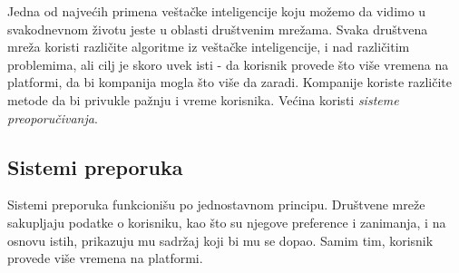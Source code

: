 \documentclass[a4paper]{article}
\newtheorem{primer}{Primer}[section]
\begin{document}
{Jedna od najvećih primena veštačke inteligencije koju možemo da vidimo u svakodnevnom životu jeste u oblasti društvenim mrežama. Svaka društvena mreža koristi različite algoritme iz veštačke inteligencije, i nad različitim problemima,
ali cilj je skoro uvek isti - da korisnik provede što više vremena na platformi, da bi kompanija mogla što više da zaradi.
Kompanije koriste različite metode da bi privukle pažnju i vreme korisnika. Većina koristi \emph{sisteme preoporučivanja}.
\subsection{Sistemi preporuka}
Sistemi preporuka funkcionišu po jednostavnom principu. Društvene mreže sakupljaju podatke o korisniku, kao što su njegove preference i zanimanja, i na osnovu istih, prikazuju mu sadržaj koji bi mu se dopao. Samim tim, korisnik provede više vremena na platformi.
}
\end{document}
